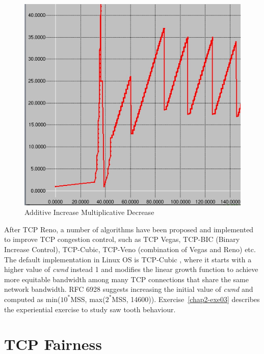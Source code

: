 \begin{multicols}{2}
\begin{figure}[H]
\centering
\includegraphics[scale=.96]{src/Figures/chap2/chap2-fig05.jpg}
\caption{Additive Increase Multiplicative Decrease}\label{chap2-fig05}
\end{figure}

After TCP Reno, a number of algorithms have been proposed and implemented to improve TCP congestion control, such as TCP Vegas,  TCP-BIC (Binary Increase Control), TCP-Cubic, TCP-Veno (combination of Vegas and Reno) etc. The default implementation in Linux OS is TCP-Cubic \cite{art2-key08}, where it starts with a higher value of \textit{cwnd} instead 1 and modifies the linear growth function to achieve more equitable bandwidth among many TCP connections that share the same network bandwidth. RFC 6928 \cite{art2-key07} suggests increasing the initial value of \textit{cwnd} and computed as min($10^{\ast}$MSS, max($2^{\ast}$MSS, 14600)). Exercise~\ref{chap2-exe03} describes the experiential exercise to study saw tooth behaviour.

\section*{TCP Fairness}


\end{multicols}
